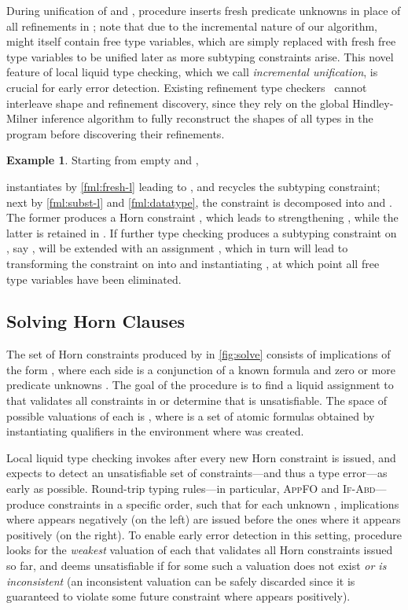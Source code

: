 \documentclass[10pt,preprint]{sigplanconf-pldi16}
\theoremstyle{definition}
\newtheorem*{example*}{Example}
\begin{document}
During unification of  and , procedure  inserts fresh predicate unknowns in place of all refinements in ;
note that due to the incremental nature of our algorithm,
 might itself contain free type variables, which are simply replaced with fresh free type variables
to be unified later as more subtyping constraints arise.
This novel feature of local liquid type checking, which we call \emph{incremental unification}, 
is crucial for early error detection.
Existing refinement type checkers~\cite{Flanagan06,RondonKaJh08} cannot interleave shape and refinement discovery,
since they rely on the global Hindley-Milner inference algorithm to fully reconstruct the shapes of all types in the program
before discovering their refinements.

\begin{example*}
Starting from empty  and ,

instantiates  by \autoref{fml:fresh-l} leading to ,
 and recycles the subtyping constraint;
next by \autoref{fml:subst-l} and \autoref{fml:datatype}, the constraint is decomposed into
 and .
The former produces a Horn constraint , which leads to strengthening ,
while the latter is retained in .
If further type checking produces a subtyping constraint on , say ,
 will be extended with an assignment ,
which in turn will lead to transforming the constraint on   into 
and instantiating ,
at which point all free type variables have been eliminated.
\end{example*}





\subsection{Solving Horn Clauses}\label{sec:theory:horn}

The set of Horn constraints  produced by  in \autoref{fig:solve}
consists of implications of the form ,
where each side is a conjunction of a known formula and zero or more predicate unknowns .
The goal of the procedure  is to find a liquid assignment to  that validates all constraints in 
or determine that  is unsatisfiable.
The space of possible valuations of each  is ,
where  is a set of atomic formulas
obtained by instantiating qualifiers  in the environment where  was created.

Local liquid type checking invokes  after every new Horn constraint is issued,
and expects to detect an unsatisfiable set of constraints---and thus a type error---as early as possible.
Round-trip typing rules---in particular, \textsc{AppFO} and \textsc{If-Abd}---produce constraints in a specific order,
such that for each unknown , 
implications where  appears negatively (on the left) are issued before the ones where it appears positively (on the right).
To enable early error detection in this setting,
procedure  looks for the \emph{weakest} valuation of each  that validates all Horn constraints issued so far,
and deems  unsatisfiable if for some  such a valuation does not exist \emph{or is inconsistent}
(an inconsistent valuation can be safely discarded since it is guaranteed to violate some future constraint where  appears positively).
\end{document}

